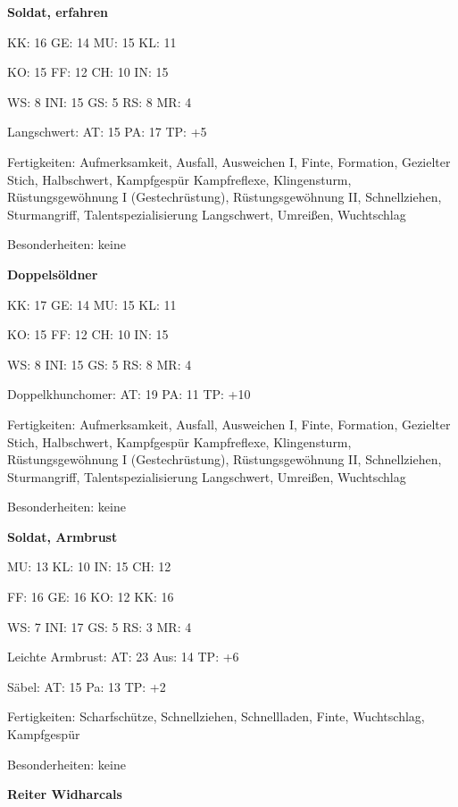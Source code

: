 {\small
\textbf{Soldat, erfahren}

KK: 16 \quad GE: 14 \quad MU: 15 \quad KL: 11

KO: 15 \quad FF: 12 \quad CH: 10 \quad IN: 15

WS: 8 \quad INI: 15 \quad GS: 5 \quad RS: 8 \quad MR: 4

Langschwert: AT: 15 \quad PA: 17 \quad TP: +5

Fertigkeiten: Aufmerksamkeit, Ausfall, Ausweichen I, Finte, Formation, Gezielter Stich, Halbschwert, Kampfgespür Kampfreflexe, Klingensturm, Rüstungsgewöhnung I (Gestechrüstung), Rüstungsgewöhnung II, Schnellziehen, Sturmangriff, Talentspezialisierung Langschwert, Umreißen, Wuchtschlag

Besonderheiten: keine \par\bigskip

\textbf{Doppelsöldner}

KK: 17 \quad GE: 14 \quad MU: 15 \quad KL: 11

KO: 15 \quad FF: 12 \quad CH: 10 \quad IN: 15

WS: 8 \quad INI: 15 \quad GS: 5 \quad RS: 8 \quad MR: 4

Doppelkhunchomer: AT: 19 \quad PA: 11 \quad TP: +10

Fertigkeiten: Aufmerksamkeit, Ausfall, Ausweichen I, Finte, Formation, Gezielter Stich, Halbschwert, Kampfgespür Kampfreflexe, Klingensturm, Rüstungsgewöhnung I (Gestechrüstung), Rüstungsgewöhnung II, Schnellziehen, Sturmangriff, Talentspezialisierung Langschwert, Umreißen, Wuchtschlag 

Besonderheiten: keine \par\bigskip

\textbf{Soldat, Armbrust}

MU: 13 \quad KL: 10 \quad IN: 15 \quad CH: 12

FF: 16 \quad GE: 16 \quad KO: 12 \quad KK: 16

WS: 7 \quad INI: 17 \quad GS: 5 \quad RS: 3 \quad MR: 4

Leichte Armbrust: AT: 23 \quad  Aus: 14 \quad TP: +6

Säbel: AT: 15 \quad Pa: 13 \quad TP: +2



Fertigkeiten: Scharfschütze, Schnellziehen, Schnellladen, Finte, Wuchtschlag, Kampfgespür

Besonderheiten: keine \par\bigskip

\textbf{Reiter Widharcals}
 
}
